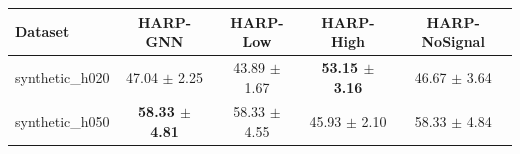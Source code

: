 \begin{tabular}{lcccc}
\toprule
Dataset & HARP-GNN & HARP-Low & HARP-High & HARP-NoSignal \\
\midrule
synthetic_h020 & 47.04 $\pm$ 2.25 & 43.89 $\pm$ 1.67 & \textbf{53.15 $\pm$ 3.16} & 46.67 $\pm$ 3.64 \\
synthetic_h050 & \textbf{58.33 $\pm$ 4.81} & 58.33 $\pm$ 4.55 & 45.93 $\pm$ 2.10 & 58.33 $\pm$ 4.84 \\
\bottomrule
\end{tabular}
